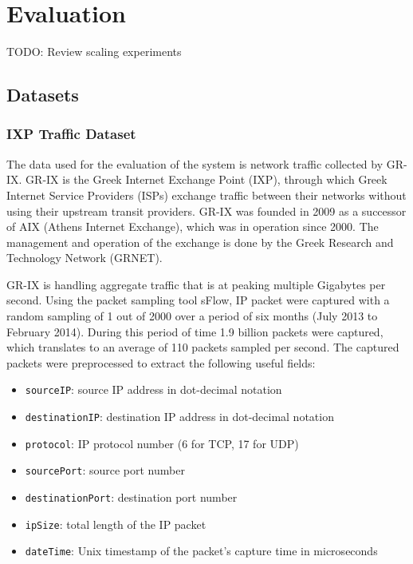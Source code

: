 \chapter{Evaluation}

TODO: Review scaling experiments

\section{Datasets}

\subsection{IXP Traffic Dataset}

The data used for the evaluation of the system is network traffic collected by GR-IX. GR-IX is the Greek  Internet Exchange Point (IXP), through which Greek Internet Service Providers (ISPs) exchange traffic between their networks without using their upstream transit providers. GR-IX was founded in 2009 as a successor of AIX (Athens Internet Exchange), which was in operation since 2000. The management and operation of the exchange is done by the Greek Research and Technology Network (GRNET).

GR-IX is handling aggregate traffic that is at peaking multiple Gigabytes per second. Using the packet sampling tool sFlow, IP packet were captured with a random sampling of 1 out of 2000 over a period of six months (July 2013 to February 2014). During this period of time 1.9 billion packets were captured, which translates to an average of 110 packets sampled per second. The captured packets were preprocessed to extract the following useful fields:
\begin{itemize}
\item \texttt{sourceIP}: source IP address in dot-decimal notation
\item \texttt{destinationIP}: destination IP address in dot-decimal notation
\item \texttt{protocol}: IP protocol number (6 for TCP, 17 for UDP)
\item \texttt{sourcePort}: source port number
\item \texttt{destinationPort}: destination port number
\item \texttt{ipSize}: total length of the IP packet
\item \texttt{dateTime}: Unix timestamp of the packet's capture time in microseconds
\end{itemize}

